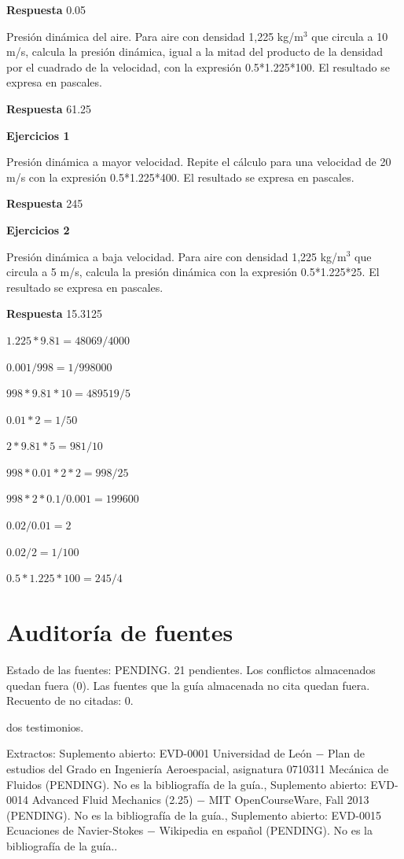 \documentclass{book}
\begin{document}
\noindent\textbf{Respuesta} 0.05

Presión dinámica del aire. Para aire con densidad 1,225 kg/m\(^{3}\) que circula a 10 m/s, calcula la presión dinámica, igual a la mitad del producto de la densidad por el cuadrado de la velocidad, con la expresión 0.5*1.225*100. El resultado se expresa en pascales.

\noindent\textbf{Respuesta} 61.25

\noindent\textbf{Ejercicios 1}

Presión dinámica a mayor velocidad. Repite el cálculo para una velocidad de 20 m/s con la expresión 0.5*1.225*400. El resultado se expresa en pascales.

\noindent\textbf{Respuesta} 245

\noindent\textbf{Ejercicios 2}

Presión dinámica a baja velocidad. Para aire con densidad 1,225 kg/m\(^{3}\) que circula a 5 m/s, calcula la presión dinámica con la expresión 0.5*1.225*25. El resultado se expresa en pascales.

\noindent\textbf{Respuesta} 15.3125

\(1.225*9.81 = 48069/4000\)

\(0.001/998 = 1/998000\)

\(998*9.81*10 = 489519/5\)

\(0.01*2 = 1/50\)

\(2*9.81*5 = 981/10\)

\(998*0.01*2*2 = 998/25\)

\(998*2*0.1/0.001 = 199600\)

\(0.02/0.01 = 2\)

\(0.02/2 = 1/100\)

\(0.5*1.225*100 = 245/4\)
\chapter{Auditoría de fuentes}

\noindent Estado de las fuentes: PENDING. 21 pendientes. Los conflictos almacenados quedan fuera (0). Las fuentes que la guía almacenada no cita quedan fuera. Recuento de no citadas: 0.

\noindent dos testimonios.

\noindent Extractos: Suplemento abierto: EVD-0001 Universidad de León \(-\) Plan de estudios del Grado en Ingeniería Aeroespacial, asignatura 0710311 Mecánica de Fluidos (PENDING). No es la bibliografía de la guía., Suplemento abierto: EVD-0014 Advanced Fluid Mechanics (2.25) \(-\) MIT OpenCourseWare, Fall 2013 (PENDING). No es la bibliografía de la guía., Suplemento abierto: EVD-0015 Ecuaciones de Navier-Stokes \(-\) Wikipedia en español (PENDING). No es la bibliografía de la guía..
\end{document}
